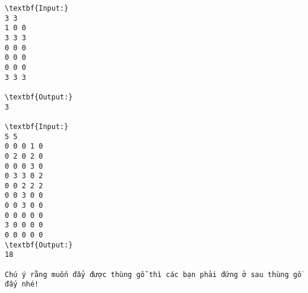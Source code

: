 \begin{verbatim}
\textbf{Input:}
3 3
1 0 0
3 3 3
0 0 0
0 0 0
0 0 0
3 3 3

\textbf{Output:}
3

\textbf{Input:}
5 5
0 0 0 1 0
0 2 0 2 0
0 0 0 3 0
0 3 3 0 2
0 0 2 2 2
0 0 3 0 0
0 0 3 0 0
0 0 0 0 0
3 0 0 0 0
0 0 0 0 0
\textbf{Output:}
18

Chú ý rằng muốn đẩy được thùng gỗ thì các bạn phải đứng ở sau thùng gỗ đấy nhé!
\end{verbatim}
